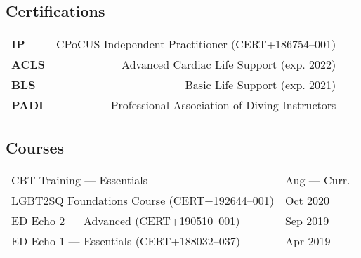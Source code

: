 \documentclass[a4paper,10pt,oneside,onecolumn,draft]{article} %
\begin{document}
\begin{multicols}{2}
  \subsection*{Certifications}
  \begin{supertabular}{a@{\SubVRule}D}
      {\bfseries IP}&{CPoCUS Independent Practitioner }{\scriptsize (CERT+186754--001)}\\
      {\bfseries ACLS}&{Advanced Cardiac Life Support }{\scriptsize (exp. 2022)}\\
      {\bfseries BLS}&{Basic Life Support }{\scriptsize(exp. 2021)}\\
      {\bfseries PADI}&{Professional Association of Diving Instructors}\\
    \end{supertabular}
    \subsection*{Courses}
    \begin{supertabular}{E@{\VRule}z}
      {CBT Training --- Essentials}&Aug --- Curr.\\
      {LGBT2SQ Foundations Course }{\scriptsize (CERT+192644--001)}&{Oct 2020}\\
      {ED Echo 2 --- Advanced }{\scriptsize (CERT+190510--001)}&Sep 2019\\
      {ED Echo 1 --- }{Essentials }{\scriptsize (CERT+188032--037)}&Apr 2019\\

      
  \end{supertabular}
\end{multicols}
\end{document}
